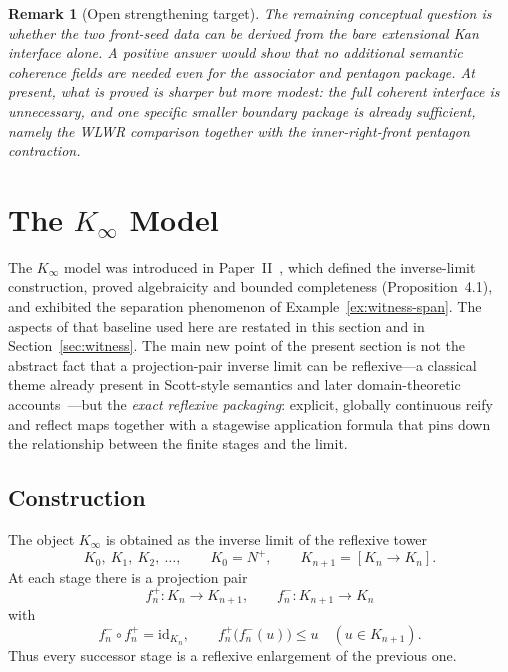 \documentclass[webpdf,traditional,large,numbered]{oup-authoring-template}
\theoremstyle{thmstyleone}%
\theoremstyle{thmstyletwo}%
\newtheorem{remark}[theorem]{Remark}
\theoremstyle{thmstylethree}%
\newcommand{\Kinf}{K_\infty}
\begin{document}
\begin{remark}[Open strengthening target]
The remaining conceptual question is whether the two front-seed data can be
derived from the bare extensional Kan interface alone.  A positive answer would
show that no additional semantic coherence fields are needed even for the
  associator and pentagon package.  At present, what is proved is sharper but more
  modest: the full coherent interface is unnecessary, and one specific smaller
  boundary package is already sufficient, namely the WLWR comparison together
  with the inner-right-front pentagon contraction.
\end{remark}

\section{The \texorpdfstring{$\Kinf$}{K-infinity} Model}\label{sec:Kinfty}

The $\Kinf$ model was introduced in Paper~II~\cite{MRdQ:Kinfinity}, which
defined the inverse-limit construction, proved algebraicity and bounded
completeness (Proposition~4.1), and exhibited the separation phenomenon of
Example~\ref{ex:witness-span}.  The aspects of that baseline used here are
restated in this section and in Section~\ref{sec:witness}.  The main new point
of the present section is not the abstract fact that a projection-pair inverse
limit can be reflexive---a classical theme already present in Scott-style
semantics and later domain-theoretic accounts~\cite{Scott:continuous,AbramskyJung:domain}---but the
\emph{exact reflexive packaging}: explicit, globally continuous reify and
reflect maps together with a stagewise application formula that pins down the
relationship between the finite stages and the limit.

\subsection{Construction}

The object $\Kinf$ is obtained as the inverse limit of the reflexive tower
\[
  K_0,\ K_1,\ K_2,\ \ldots,
  \qquad
  K_0=N^+,\qquad K_{n+1}=[K_n\to K_n].
\]
At each stage there is a projection pair
\[
  f_n^+ : K_n \longrightarrow K_{n+1},
  \qquad
  f_n^- : K_{n+1} \longrightarrow K_n
\]
with
\[
  f_n^- \circ f_n^+ = \mathrm{id}_{K_n},
  \qquad
  f_n^+\bigl(f_n^-(u)\bigr)\leq u
  \quad (u\in K_{n+1}).
\]
Thus every successor stage is a reflexive enlargement of the previous one.
\end{document}

